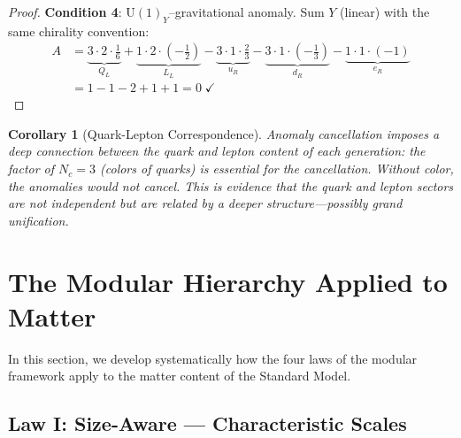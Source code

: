 \documentclass[12pt]{article}
\newtheorem{corollary}[theorem]{Corollary}
\theoremstyle{definition}
\theoremstyle{remark}
\begin{document}
\begin{proof}
\textbf{Condition 4}: $\mathrm{U}(1)_Y$--gravitational anomaly. Sum $Y$ (linear) with the same chirality convention:
\begin{align}
A &= \underbrace{3 \cdot 2 \cdot \frac{1}{6}}_{Q_L} + \underbrace{1 \cdot 2 \cdot \left(-\frac{1}{2}\right)}_{L_L} - \underbrace{3 \cdot 1 \cdot \frac{2}{3}}_{u_R} - \underbrace{3 \cdot 1 \cdot \left(-\frac{1}{3}\right)}_{d_R} - \underbrace{1 \cdot 1 \cdot (-1)}_{e_R} \nonumber \\
&= 1 - 1 - 2 + 1 + 1 = 0 \; \checkmark
\end{align}
\end{proof}

\begin{corollary}[Quark-Lepton Correspondence]
\label{cor:qlcorrespondence}
Anomaly cancellation imposes a deep connection between the quark and lepton content of each generation: the factor of $N_c = 3$ (colors of quarks) is essential for the cancellation. Without color, the anomalies would not cancel. This is evidence that the quark and lepton sectors are not independent but are related by a deeper structure---possibly grand unification.
\end{corollary}

\section{The Modular Hierarchy Applied to Matter}
\label{sec:modularhierarchy}

In this section, we develop systematically how the four laws of the modular framework apply to the matter content of the Standard Model.

\subsection{Law I: Size-Aware --- Characteristic Scales}
\end{document}

